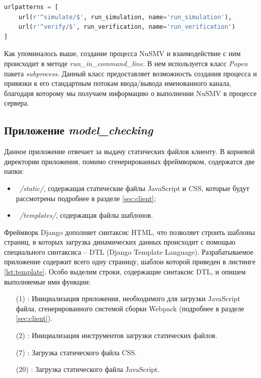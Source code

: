 \begin{lstlisting}[language=Python, 
label=lst:url_assign, 
caption={Фрагмент файла urls.py.}]
urlpatterns = [
	url(r'^simulate/$', run_simulation, name='run_simulation'),
	url(r'^verify/$', run_verification, name='run_verification')
]
\end{lstlisting}

Как упоминалось выше, создание процесса NuSMV и взаимодействие с ним происходит в методе \textit{run\_in\_command\_line}. В нем используется класс \textit{Popen} пакета \textit{subprocess}. Данный класс предоставляет возможность создания процесса и привязки к его стандартным потокам ввода/вывода именованного канала, благодаря которому мы получаем информацию о выполнении NuSMV в процессе сервера.

\subsection{Приложение \textit{model\_checking}}

Данное приложение отвечает за выдачу статических файлов клиенту. В корневой директории приложения, помимо сгенерированных фреймворком, содержатся две папки:

\begin{itemize}
	\item \textit{~/static/}, содержащая статические файлы JavaScript и CSS, которые будут рассмотрены подробнее в разделе \ref{sec:client};
	\item \textit{~/templates/}, содержащая файлы шаблонов.
\end{itemize} 

Фреймворк Django дополняет синтаксис HTML, что позволяет строить шаблоны страниц, в которых загрузка динамических данных происходит с помощью специального синтаксиса -- DTL (Django Template Language). Разрабатываемое приложение содержит всего одну страницу, шаблон которой приведен в листинге \ref{lst:template}. Особо выделим строки, содержащие синтаксис DTL, и опишем выполняемые ими функции:

\begin{itemize}
	\item [(1)]: Инициализация приложения, необходимого для загрузки JavaScript файла, сгенерированного системой сборки Webpack (подробнее в разделе \ref{sec:client}).
	\item [(2)]: Инициализация инструментов загрузки статических файлов.
	\item [(7)]: Загрузка статического файла CSS.
	\item [(20)]: Загрузка статического файла JavaScript.
\end{itemize}


